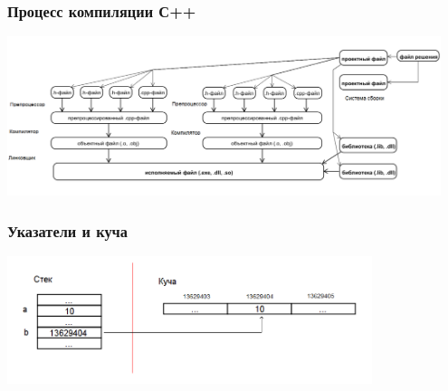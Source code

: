 \documentclass[xetex,mathserif,serif]{beamer}
\begin{document}
	\begin{frame}
		\frametitle{Процесс компиляции С++}
		\begin{center}
			\includegraphics[width=0.95\textwidth]{compilation.png}
		\end{center}
	\end{frame}

	\begin{frame}
		\frametitle{Указатели и куча}
		\begin{center}
			\includegraphics[width=0.8\textwidth]{pointers.png}
		\end{center}
	\end{frame}
\end{document}
